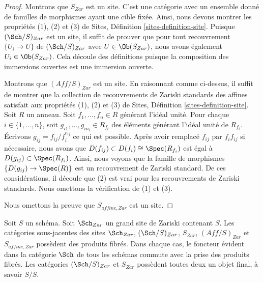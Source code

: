 \begin{proof}
Montrons que $S_{Zar}$ est un site. C'est une catégorie avec un ensemble donné de familles de morphismes ayant une cible fixée. Ainsi, nous devons montrer les propriétés (1), (2) et (3) de Sites, Définition \ref{sites-definition-site}. Puisque $(\Sch/S)_{Zar}$ est un site, il suffit de prouver que pour tout recouvrement $\{U_i \to U\}$ de $(\Sch/S)_{Zar}$ avec $U \in \Ob(S_{Zar})$, nous avons également $U_i \in \Ob(S_{Zar})$. Cela découle des définitions puisque la composition des immersions ouvertes est une immersion ouverte.

\medskip\noindent
Montrons que $(\textit{Aff}/S)_{Zar}$ est un site. En raisonnant comme ci-dessus, il suffit de montrer que la collection de recouvrements de Zariski standards des affines satisfait aux propriétés (1), (2) et (3) de Sites, Définition \ref{sites-definition-site}. Soit $R$ un anneau. Soit $f_1, \ldots, f_n \in R$ générant l'idéal unité. Pour chaque $i \in \{1, \ldots, n\}$, soit $g_{i1}, \ldots, g_{in_i} \in R_{f_i}$ des éléments générant l'idéal unité de $R_{f_i}$. Écrivons $g_{ij} = f_{ij}/f_i^{e_{ij}}$ ce qui est possible. Après avoir remplacé $f_{ij}$ par $f_i f_{ij}$ si nécessaire, nous avons que $D(f_{ij}) \subset D(f_i) \cong \Spec(R_{f_i})$ est égal à $D(g_{ij}) \subset \Spec(R_{f_i})$. Ainsi, nous voyons que la famille de morphismes $\{D(g_{ij}) \to \Spec(R)\}$ est un recouvrement de Zariski standard. De ces considérations, il découle que (2) est vrai pour les recouvrements de Zariski standards. Nous omettons la vérification de (1) et (3).

\medskip\noindent
Nous omettons la preuve que $S_{affine, Zar}$ est un site.
\end{proof}

\begin{lemma}
\label{lemma-fibre-products-Zariski}
Soit $S$ un schéma. Soit $\Sch_{Zar}$ un grand site de Zariski contenant $S$. Les catégories sous-jacentes des sites $\Sch_{Zar}$, $(\Sch/S)_{Zar}$, $S_{Zar}$, $(\textit{Aff}/S)_{Zar}$ et $S_{affine, Zar}$ possèdent des produits fibrés. Dans chaque cas, le foncteur évident dans la catégorie $\Sch$ de tous les schémas commute avec la prise des produits fibrés. Les catégories $(\Sch/S)_{Zar}$ et $S_{Zar}$ possèdent toutes deux un objet final, à savoir $S/S$.
\end{lemma}

